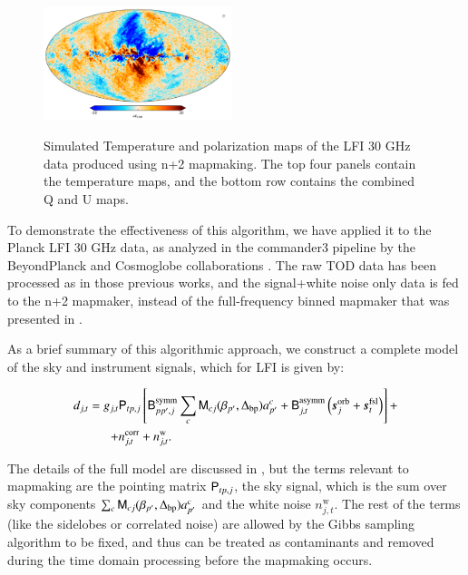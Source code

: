 \documentclass{aa}
\begin{document}
\begin{figure}
  \includegraphics[width=0.49\textwidth]{figs/sim_U.pdf}\\
  \caption{Simulated Temperature and polarization maps of the LFI 30 GHz data produced using n+2 mapmaking. The top four panels contain the temperature maps, and the bottom row contains the combined Q and U maps.}
  \label{fig:sim}
\end{figure}


To demonstrate the effectiveness of this algorithm, we have applied it to the Planck LFI 30 GHz data, as analyzed in the commander3 pipeline by the BeyondPlanck and Cosmoglobe collaborations \citep{BP01, watts2023_dr1}. The raw TOD data has been processed as in those previous works, and the signal+white noise only data is fed to the n+2 mapmaker, instead of the full-frequency binned mapmaker that was presented in \citet{BP10}. 

As a brief summary of this algorithmic approach, we construct a complete model of the sky and instrument signals, which for LFI is given by:

\begin{equation}
  \begin{split}
    d_{j,t} = g_{j,t}&\mathsf{P}_{tp,j}\left[\mathsf{B}^{\mathrm{symm}}_{pp',j}\sum_{c}
      \mathsf{M}_{cj}(\beta_{p'}, \Delta_{\mathrm{bp}})a^c_{p'}  + \mathsf{B}^{\mathrm{asymm}}_{j,t}\left(\boldsymbol{s}^{\mathrm{orb}}_{j}  
      + \boldsymbol{s}^{\mathrm{fsl}}_{t}\right)\right] + \\
    + &n^{\mathrm{corr}}_{j,t} + n^{\mathrm{w}}_{j,t}.
  \end{split}
  \label{eq:todmodel}
\end{equation}

The details of the full model are discussed in \citep{BP01}, but the terms relevant to mapmaking are the pointing matrix $\mathsf{P}_{tp,j}$, the sky signal, which is the sum over sky components $\sum_{c} \mathsf{M}_{cj}(\beta_{p'}, \Delta_{\mathrm{bp}})a^c_{p'}$ and the white noise $n^{\mathrm{w}}_{j,t}$. The rest of the terms (like the sidelobes or correlated noise) are allowed by the Gibbs sampling algorithm \citep{gibbs} to be fixed, and thus can be treated as contaminants and removed during the time domain processing before the mapmaking occurs. 
\end{document}
